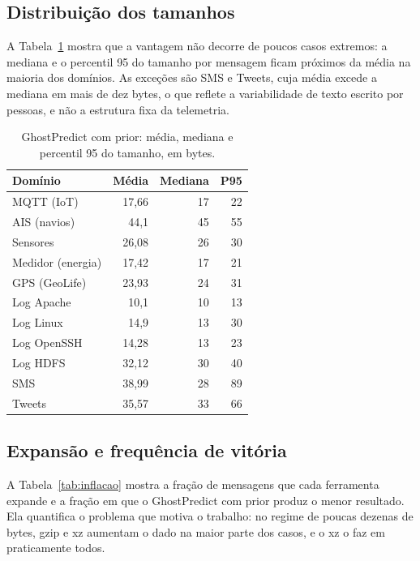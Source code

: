 \documentclass[12pt]{article}
\begin{document}
\subsection{Distribuição dos tamanhos}

A Tabela~\ref{tab:dist} mostra que a vantagem não decorre de poucos casos
extremos: a mediana e o percentil 95 do tamanho por mensagem ficam próximos da
média na maioria dos domínios. As exceções são SMS e Tweets, cuja média excede a
mediana em mais de dez bytes, o que reflete a variabilidade de texto escrito por
pessoas, e não a estrutura fixa da telemetria.

\begin{table}[ht]
\centering
\caption{GhostPredict com prior: média, mediana e percentil 95 do tamanho, em
  bytes.}
\label{tab:dist}
\begin{tabular}{lrrr}
\toprule
\textbf{Domínio} & \textbf{Média} & \textbf{Mediana} & \textbf{P95} \\
\midrule
MQTT (IoT) & 17,66 & 17 & 22 \\
AIS (navios) & 44,1 & 45 & 55 \\
Sensores & 26,08 & 26 & 30 \\
Medidor (energia) & 17,42 & 17 & 21 \\
GPS (GeoLife) & 23,93 & 24 & 31 \\
Log Apache & 10,1 & 10 & 13 \\
Log Linux & 14,9 & 13 & 30 \\
Log OpenSSH & 14,28 & 13 & 23 \\
Log HDFS & 32,12 & 30 & 40 \\
SMS & 38,99 & 28 & 89 \\
Tweets & 35,57 & 33 & 66 \\
\bottomrule
\end{tabular}
\end{table}

\subsection{Expansão e frequência de vitória}

A Tabela~\ref{tab:inflacao} mostra a fração de mensagens que cada ferramenta
expande e a fração em que o GhostPredict com prior produz o menor resultado. Ela
quantifica o problema que motiva o trabalho: no regime de poucas dezenas de
bytes, gzip e xz aumentam o dado na maior parte dos casos, e o xz o faz em
praticamente todos.
\end{document}
